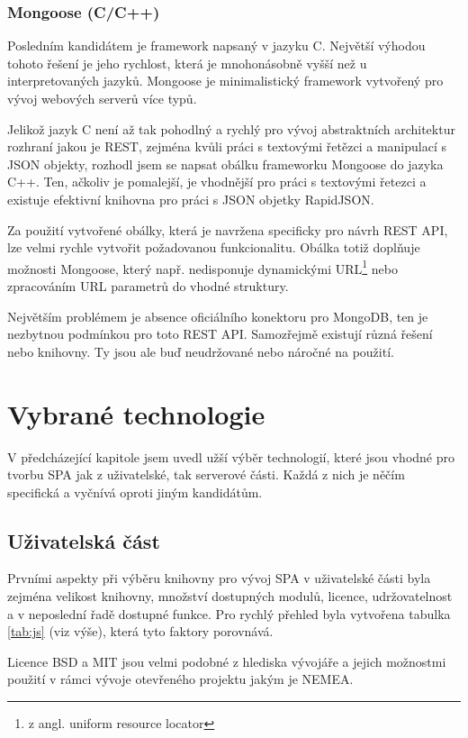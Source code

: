 \subsubsection*{Mongoose (C/C++)}

Posledním kandidátem je framework napsaný v jazyku C. Největší výhodou tohoto řešení je jeho rychlost, která je mnohonásobně vyšší než u interpretovaných jazyků. Mongoose je minimalistický framework vytvořený pro vývoj webových serverů více typů.

Jelikož jazyk C není až tak pohodlný a rychlý pro vývoj abstraktních architektur rozhraní jakou je REST, zejména kvůli práci s textovými řetězci a manipulací s JSON objekty, rozhodl jsem se napsat obálku frameworku Mongoose do jazyka C++. Ten, ačkoliv je pomalejší, je vhodnější pro práci s textovými řetezci a existuje efektivní knihovna pro práci s JSON objetky RapidJSON\cite{js:rjson}.

Za použití vytvořené obálky, která je navržena specificky pro návrh REST API, lze velmi rychle vytvořit požadovanou funkcionalitu. Obálka totiž doplňuje možnosti Mongoose, který např. nedisponuje dynamickými URL\footnote{z angl. uniform resource locator} nebo zpracováním URL parametrů do vhodné struktury.

Největším problémem je absence oficiálního konektoru pro MongoDB, ten je nezbytnou podmínkou pro toto REST API. Samozřejmě existují různá řešení nebo knihovny. Ty jsou ale buď neudržované nebo náročné na použití.

\section{Vybrané technologie}

V předcházející kapitole jsem uvedl užší výběr technologií, které jsou vhodné pro tvorbu SPA jak z uživatelské, tak serverové části. Každá z nich je něčím specifická a vyčnívá oproti jiným kandidátům.

\subsection{Uživatelská část}

Prvními aspekty při výběru knihovny pro vývoj SPA v uživatelské části byla zejména velikost knihovny, množství dostupných modulů, licence, udržovatelnost a v neposlední řadě dostupné funkce. Pro rychlý přehled byla vytvořena tabulka \ref{tab:js} (viz výše), která tyto faktory porovnává.

Licence BSD a MIT jsou velmi podobné z hlediska vývojáře a jejich možnostmi použití v rámci vývoje otevřeného projektu jakým je NEMEA.

